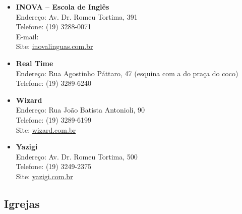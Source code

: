 \begin{itemize}
    \item   \textbf{INOVA -- Escola de Inglês}
        \\Endereço: Av. Dr. Romeu Tortima, 391
        \\Telefone: (19) 3288-0071
        \\E-mail: 
        \\Site: \url{inovalinguas.com.br}

    \item   \textbf{Real Time}
        \\Endereço: Rua Agostinho Páttaro, 47 (esquina com a do praça do coco)
        \\Telefone: (19) 3289-6240

    \item   \textbf{Wizard}
        \\Endereço: Rua João Batista Antonioli, 90
        \\Telefone: (19) 3289-6199
        \\Site: \url{wizard.com.br}

    \item   \textbf{Yazigi}
        \\Endereço: Av. Dr. Romeu Tortima, 500
        \\Telefone: (19) 3249-2375
        \\Site: \url{yazigi.com.br}
\end{itemize}

\subsection{Igrejas}

